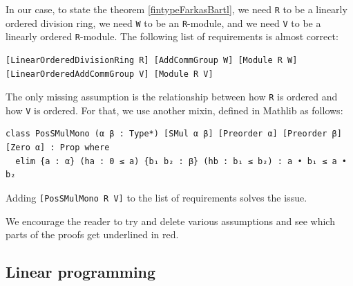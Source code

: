 \documentclass[]{article}
\renewcommand{\.}{\hskip .75pt}
\begin{document}
In our case, to state the theorem \ref{fintypeFarkasBartl},
we need \texttt{R} to be a linearly ordered division ring,
we need \texttt{W} to be an \texttt{R}-module, and
we need \texttt{V} to be a linearly ordered \texttt{R}-module.
The following list of requirements is almost correct:
\begin{lstlisting}
[LinearOrderedDivisionRing R] [AddCommGroup W] [Module R W] [LinearOrderedAddCommGroup V] [Module R V]
\end{lstlisting}
The only missing assumption is the relationship between
how \texttt{R} is ordered and how \texttt{V} is ordered.
For that, we use another mixin, defined in Mathlib as follows:
\begin{lstlisting}
class PosSMulMono (α β : Type*) [SMul α β] [Preorder α] [Preorder β] [Zero α] : Prop where
  elim {a : α} (ha : 0 ≤ a) {b₁ b₂ : β} (hb : b₁ ≤ b₂) : a • b₁ ≤ a • b₂
\end{lstlisting}
Adding \texttt{[PosSMulMono R V]} to the list of requirements solves the issue.

We encourage the reader to try and delete various assumptions and see which parts of the proofs
get underlined in red.


\subsection{Linear programming}
\label{preliminaries-lp}
\end{document}
